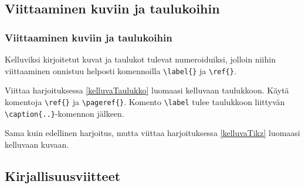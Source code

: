 \subsection{Viittaaminen kuviin ja taulukoihin}
\begin{frame}[fragile]
    \frametitle{Viittaaminen kuviin ja taulukoihin}
    Kelluviksi kirjoitetut kuvat ja taulukot tulevat numeroiduiksi, jolloin niihin viittaaminen onnistuu helposti komennoilla \verb-\label{}- ja \verb-\ref{}-. 
    \begin{harj}
        Viittaa harjoituksessa \ref{kelluvaTaulukko} luomaasi kelluvaan taulukkoon. Käytä komentoja \verb-\ref{}- ja \verb-\pageref{}-. Komento \verb-\label- tulee taulukkoon liittyvän \verb-\caption{..}--komennon jälkeen.
        \vaihto
    \end{harj}
    \begin{harj}
        Sama kuin edellinen harjoitus, mutta viittaa harjoituksessa \ref{kelluvaTikz} luomaasi kelluvaan kuvaan.
    \end{harj}
\end{frame}
\subsection{Kirjallisuusviitteet}
